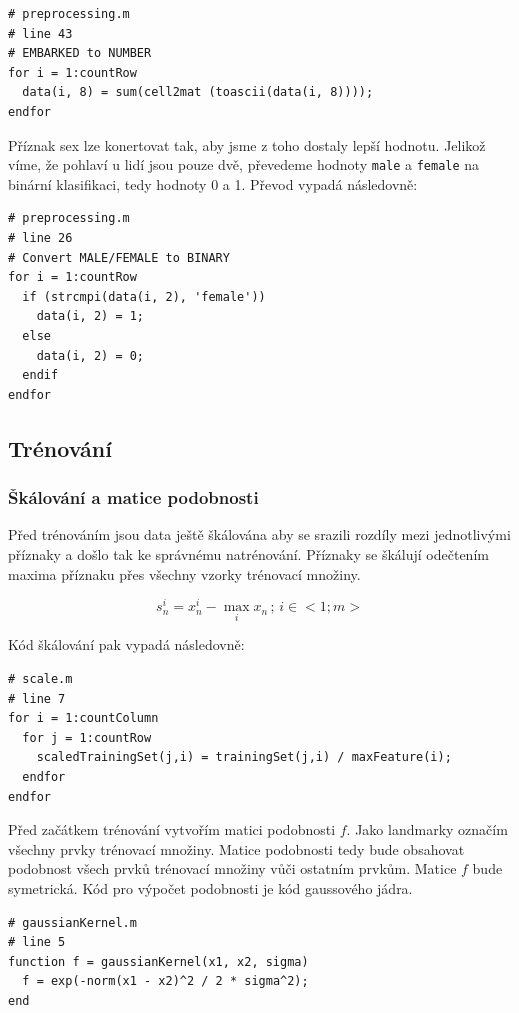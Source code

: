 \documentclass[a4]{article}
\begin{document}
\begin{lstlisting}
# preprocessing.m
# line 43 
# EMBARKED to NUMBER
for i = 1:countRow
  data(i, 8) = sum(cell2mat (toascii(data(i, 8))));
endfor
\end{lstlisting}

\noindent Příznak sex lze konertovat tak, aby jsme z toho dostaly lepší hodnotu. Jelikož víme, že pohlaví u lidí jsou pouze dvě, převedeme hodnoty \texttt{male} a \texttt{female} na binární klasifikaci, tedy hodnoty 0 a 1. Převod vypadá následovně:

\begin{lstlisting}
# preprocessing.m
# line 26 
# Convert MALE/FEMALE to BINARY
for i = 1:countRow
  if (strcmpi(data(i, 2), 'female'))
    data(i, 2) = 1;
  else
    data(i, 2) = 0;
  endif
endfor
\end{lstlisting}

\subsection{Trénování}
\subsubsection{Škálování a matice podobnosti}
Před trénováním jsou data ještě škálována aby se srazili rozdíly mezi jednotlivými příznaky a došlo tak ke správnému natrénování. Příznaky se škálují odečtením maxima příznaku přes všechny vzorky trénovací množiny.

$$
s_{n}^{i} = x_{n}^{i} - \max_{i} x_{n} \,;\, i \in <1;m>
$$

\noindent Kód škálování pak vypadá následovně:

\begin{lstlisting}
# scale.m
# line 7 
for i = 1:countColumn
  for j = 1:countRow
    scaledTrainingSet(j,i) = trainingSet(j,i) / maxFeature(i);
  endfor
endfor 
\end{lstlisting}

\noindent Před začátkem trénování vytvořím matici podobnosti $f$. Jako landmarky označím všechny prvky trénovací množiny. Matice podobnosti tedy bude obsahovat podobnost všech prvků trénovací množiny vůči ostatním prvkům. Matice $f$ bude symetrická. Kód pro výpočet podobnosti je kód gaussového jádra.

\begin{lstlisting}
# gaussianKernel.m
# line 5
function f = gaussianKernel(x1, x2, sigma)
  f = exp(-norm(x1 - x2)^2 / 2 * sigma^2); 
end
\end{lstlisting}
\end{document}
